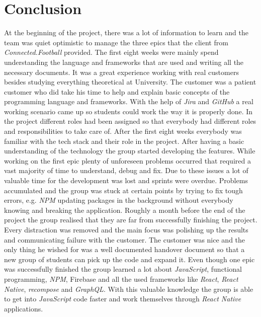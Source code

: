 \section{Conclusion}
\label{sec:Conclusion}

At the beginning of the project, there was a lot of information to learn and the team was quiet optimistic to manage the three epics that the client from \textit{Connected.Football} provided. The first eight weeks were mainly spend understanding the language and frameworks that are used and writing all the necessary documents. It was a great experience working with real customers besides studying everything theoretical at University. The customer was a patient customer who did take his time to help and explain basic concepts of the programming language and frameworks. With the help of \textit{Jira} and \textit{GitHub} a real working scenario came up so students could work the way it is properly done. In the project different roles had been assigned so that everybody had different roles and responsibilities to take care of. After the first eight weeks everybody was familiar with the tech stack and their role in the project.
\newline
After having a basic understanding of the technology the group started developing the features. While working on the first epic plenty of unforeseen problems occurred that required a vast majority of time to understand, debug and fix. Due to these issues a lot of valuable time for the development was lost and sprints were overdue. Problems accumulated and the group was stuck at certain points by trying to fix tough errors, e.g. \textit{NPM} updating packages in the background without everybody knowing and breaking the application.
\newline
Roughly a month before the end of the project the group realised that they are far from successfully finishing the project. Every distraction was removed and the main focus was polishing up the results and communicating failure with the customer. The customer was nice and the only thing he wished for was a well documented handover document so that a new group of students can pick up the code and expand it.
\newline
Even though one epic was successfully finished the group learned a lot about \textit{JavaScript}, functional programming, \textit{NPM}, Firebase and all the used frameworks like \textit{React}, \textit{React Native}, \textit{recompose} and \textit{GraphQL}. With this valuable knowledge the group is able to get into \textit{JavaScript} code faster and work themselves through \textit{React Native} applications.